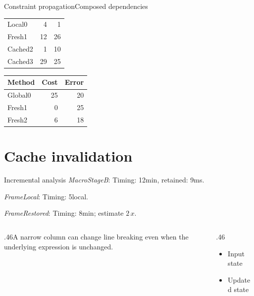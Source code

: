\documentclass[11pt,aspectratio=43]{beamer}
\newcommand{\fuzzlayerA}[1]{\textbf{#1}}
\newcommand{\fuzzlayerB}[1]{\fuzzlayerA{#1}}
\newcommand{\fuzzlayerC}[1]{\fuzzlayerB{#1}}
\newcommand{\fuzzterm}[1]{\fuzzlayerC{#1}}
\newcommand{\fuzzpair}[2]{\fuzzterm{#1}: #2}
\newcommand{\fuzzunit}{ms}
\let\fuzzoriginalunit\fuzzunit
\newcommand{\fuzzcoefficient}{2}
\newcommand{\fuzzscale}[2][\fuzzcoefficient]{#1\,#2}
\begin{document}
\begin{frame}[t,shrink=5]{Constraint propagation}{Composed dependencies}
{\begin{itemize}
\begin{description}
\begin{tabular}{lrr}
Local0&4&1\\
Fresh1&12&26\\
Cached2&1&10\\
Cached3&29&25\\
\end{tabular}
\item<2->[Stage 2] \begin{tabular}{lrr}Method&Cost&Error\\\hline
Global0&25&20\\
Fresh1&0&25\\
Fresh2&6&18\\
\end{tabular}
\end{description}
\end{itemize}}
\par {}
\end{frame}
\renewcommand{\fuzzunit}{min}
\renewcommand{\fuzzcoefficient}{2}
\renewcommand{\fuzzterm}[1]{{\textit{#1}}}
\section{Cache invalidation}
\begin{frame}[t]{Incremental analysis}
\fuzzpair{MacroStageB}{Timing: 12\fuzzunit, retained: 9\fuzzoriginalunit.}\par
{\renewcommand{\fuzzunit}{local}\fuzzpair{FrameLocal}{Timing: 5\fuzzunit.}\par}
\fuzzpair{FrameRestored}{Timing: 8\fuzzunit; estimate $\fuzzscale{x}$.}\par
\begin{columns}[T]\begin{column}{.46\textwidth}A narrow column can change line breaking even when the underlying expression is unchanged.\end{column}\begin{column}{.46\textwidth}\begin{itemize}\item Input state\item Updated state\end{itemize}\end{column}\end{columns}
\end{frame}
\end{document}
